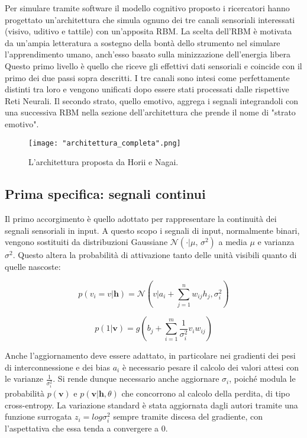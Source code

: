 \documentclass[10pt,letterpaper]{article}
\begin{document}
Per simulare tramite software il modello cognitivo proposto i ricercatori hanno progettato un'architettura che simula ognuno dei tre canali sensoriali interessati (visivo, uditivo e tattile) con un'apposita RBM. La scelta dell'RBM è motivata da un'ampia letteratura a sostegno della bontà dello strumento nel simulare l'apprendimento umano, anch'esso basato sulla minizzazione dell'energia libera Questo primo livello è quello che riceve gli effettivi dati sensoriali e coincide con il primo dei due passi sopra descritti. I tre canali sono  intesi come perfettamente distinti tra loro e vengono unificati dopo essere stati processati dalle rispettive Reti Neurali. Il secondo strato, quello emotivo, aggrega i segnali integrandoli con una successiva RBM nella sezione dell'architettura che prende il nome di "strato emotivo".

\begin{figure}[h!]
	\centering
	\texttt{[image: "architettura\_completa".png]}
	\caption{L'architettura proposta da Horii e Nagai.}
	\label{fig:screen3}
\end{figure}

\newpage
\subsection{Prima specifica: segnali continui}
Il primo accorgimento è quello adottato per rappresentare la continuità dei segnali sensoriali in input. A questo scopo i segnali di input, normalmente binari, vengono sostituiti da distribuzioni Gaussiane $\mathcal{N}( \cdot | \mu,\,\sigma^{2})$ a media $\mu$ e varianza $\sigma^{2}$. Questo altera la probabilità di attivazione tanto delle unità visibili quanto di quelle nascoste:

\begin{equation}
p(v_i = v|\textbf{h}) = \mathcal{N}(v|a_i + \sum_{j=1}^{n}w_{ij}h_j,\sigma_i^2)
\end{equation}

\begin{equation}
p(1|\textbf{v}) = g(b_j + \sum_{i=1}^{m}\frac{1}{\sigma_i^2}v_iw_{ij})
\end{equation}

Anche l'aggiornamento deve essere adattato, in particolare nei gradienti dei pesi di interconnessione e dei bias $a_i$ è necessario pesare il calcolo dei valori attesi con le varianze $\frac{1}{\sigma_i^2}$. Si rende dunque necessario anche aggiornare $\sigma_i$, poiché modula le probabilità $p(\textbf{v})$ e $p(\textbf{v}|\textbf{h}, \theta)$ che concorrono al calcolo della perdita, di tipo cross-entropy. La variazione standard è stata aggiornata dagli autori tramite una funzione surrogata $z_i = log\sigma_i^2$ sempre tramite discesa del gradiente, con l'aspettativa che essa tenda a convergere a 0.
\end{document}
